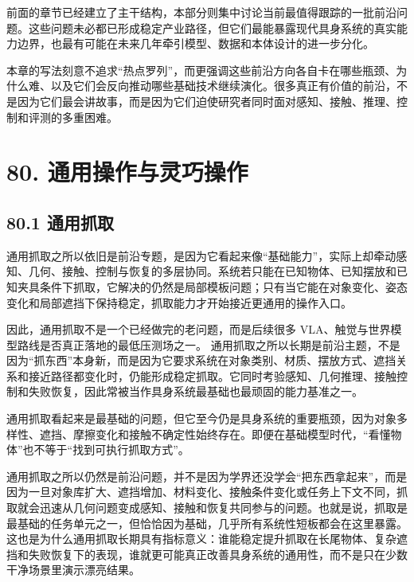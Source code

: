

前面的章节已经建立了主干结构，本部分则集中讨论当前最值得跟踪的一批前沿问题。这些问题未必都已形成稳定产业路径，但它们最能暴露现代具身系统的真实能力边界，也最有可能在未来几年牵引模型、数据和本体设计的进一步分化。

本章的写法刻意不追求“热点罗列”，而更强调这些前沿方向各自卡在哪些瓶颈、为什么难、以及它们会反向推动哪些基础技术继续演化。很多真正有价值的前沿，不是因为它们最会讲故事，而是因为它们迫使研究者同时面对感知、接触、推理、控制和评测的多重困难。

\section*{80. 通用操作与灵巧操作}

\subsection*{80.1 通用抓取}


通用抓取之所以依旧是前沿专题，是因为它看起来像“基础能力”，实际上却牵动感知、几何、接触、控制与恢复的多层协同。系统若只能在已知物体、已知摆放和已知夹具条件下抓取，它解决的仍然是局部模板问题；只有当它能在对象变化、姿态变化和局部遮挡下保持稳定，抓取能力才开始接近更通用的操作入口。

因此，通用抓取不是一个已经做完的老问题，而是后续很多 VLA、触觉与世界模型路线是否真正落地的最低压测场之一。 通用抓取之所以长期是前沿主题，不是因为“抓东西”本身新，而是因为它要求系统在对象类别、材质、摆放方式、遮挡关系和接近路径都变化时，仍能形成稳定抓取。它同时考验感知、几何推理、接触控制和失败恢复，因此常被当作具身系统最基础也最顽固的能力基准之一。

通用抓取看起来是最基础的问题，但它至今仍是具身系统的重要瓶颈，因为对象多样性、遮挡、摩擦变化和接触不确定性始终存在。即便在基础模型时代，“看懂物体”也不等于“找到可执行抓取方式”。

通用抓取之所以仍然是前沿问题，并不是因为学界还没学会“把东西拿起来”，而是因为一旦对象库扩大、遮挡增加、材料变化、接触条件变化或任务上下文不同，抓取就会迅速从几何问题变成感知、接触和恢复共同参与的问题。也就是说，抓取是最基础的任务单元之一，但恰恰因为基础，几乎所有系统性短板都会在这里暴露。 这也是为什么通用抓取长期具有指标意义：谁能稳定提升抓取在长尾物体、复杂遮挡和失败恢复下的表现，谁就更可能真正改善具身系统的通用性，而不是只在少数干净场景里演示漂亮结果。

